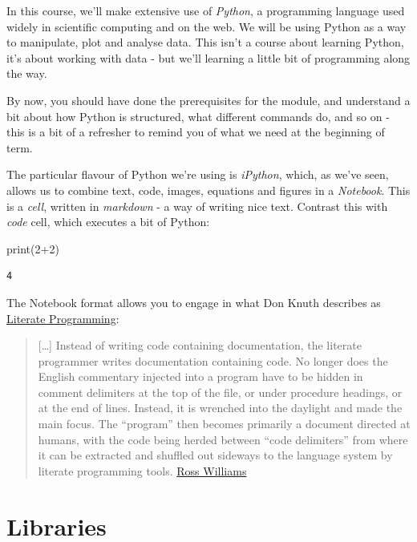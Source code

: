 \documentclass[
  letterpaper,
  DIV=11,
  numbers=noendperiod]{scrreprt}
\newenvironment{Shaded}{\begin{snugshade}}{\end{snugshade}}
\newcommand{\BuiltInTok}[1]{\textcolor[rgb]{0.00,0.23,0.31}{#1}}
\newcommand{\DecValTok}[1]{\textcolor[rgb]{0.68,0.00,0.00}{#1}}
\newcommand{\NormalTok}[1]{\textcolor[rgb]{0.00,0.23,0.31}{#1}}
\newcommand{\OperatorTok}[1]{\textcolor[rgb]{0.37,0.37,0.37}{#1}}
\begin{document}
In this course, we'll make extensive use of \emph{Python}, a programming
language used widely in scientific computing and on the web. We will be
using Python as a way to manipulate, plot and analyse data. This isn't a
course about learning Python, it's about working with data - but we'll
learning a little bit of programming along the way.

By now, you should have done the prerequisites for the module, and
understand a bit about how Python is structured, what different commands
do, and so on - this is a bit of a refresher to remind you of what we
need at the beginning of term.

The particular flavour of Python we're using is \emph{iPython}, which,
as we've seen, allows us to combine text, code, images, equations and
figures in a \emph{Notebook}. This is a \emph{cell}, written in
\emph{markdown} - a way of writing nice text. Contrast this with
\emph{code} cell, which executes a bit of Python:

\begin{Shaded}
\begin{Highlighting}[]
\BuiltInTok{print}\NormalTok{(}\DecValTok{2}\OperatorTok{+}\DecValTok{2}\NormalTok{)}
\end{Highlighting}
\end{Shaded}

\begin{verbatim}
4
\end{verbatim}

The Notebook format allows you to engage in what Don Knuth describes as
\href{http://en.wikipedia.org/wiki/Literate_programming}{Literate
Programming}:

\begin{quote}
{[}\ldots{]} Instead of writing code containing documentation, the
literate programmer writes documentation containing code. No longer does
the English commentary injected into a program have to be hidden in
comment delimiters at the top of the file, or under procedure headings,
or at the end of lines. Instead, it is wrenched into the daylight and
made the main focus. The ``program'' then becomes primarily a document
directed at humans, with the code being herded between ``code
delimiters'' from where it can be extracted and shuffled out sideways to
the language system by literate programming tools.
\href{http://www.literateprogramming.com/lpquotes.html}{Ross Williams}
\end{quote}

\hypertarget{libraries}{%
\section{Libraries}\label{libraries}}
\end{document}
